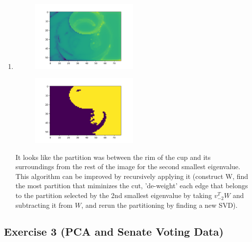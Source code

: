\documentclass[11pt]{article}
\begin{document}
\begin{solution}
\begin{enumerate}
\item
\begin{figure}[H]
    \centerline{\includegraphics[width=0.5\textwidth]{figs/heatmap_eig2.png}}
\end{figure}

\begin{figure}[H]
    \centerline{\includegraphics[width=0.5\textwidth]{figs/binary_eig2.png}}
\end{figure}

It looks like the partition was between the rim of the cup and its surroundings from the rest of the image for the second smallest eigenvalue. This algorithm can be improved by recursively applying it (construct W, find the most partition that miminizes the cut, 'de-weight' each edge that belongs to the partition selected by the 2nd smallest eigenvalue by taking $v_{-2}^T W$ and subtracting it from $W$, and rerun the partitioning by finding a new SVD).
\end{enumerate}
\end{solution}

\newpage
\subsection*{Exercise 3 (PCA and Senate Voting Data)}
\end{document}
